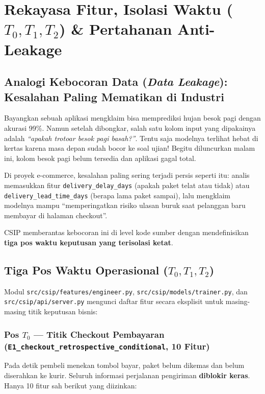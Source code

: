\documentclass[11pt,a4paper,oneside]{book}
\newcommand{\code}[1]{{\small\nolinkurl{#1}}}
\begin{document}
\chapter{Rekayasa Fitur, Isolasi Waktu ($T_0, T_1, T_2$) \& Pertahanan Anti-Leakage}

\section{Analogi Kebocoran Data (\emph{Data Leakage}): Kesalahan Paling Mematikan di Industri}

\begin{bisnisbox}
Bayangkan sebuah aplikasi mengklaim bisa memprediksi hujan besok pagi dengan akurasi 99\%. Namun setelah dibongkar, salah satu kolom input yang dipakainya adalah \emph{``apakah trotoar besok pagi basah?''}. Tentu saja modelnya terlihat hebat di kertas karena masa depan sudah bocor ke soal ujian! Begitu diluncurkan malam ini, kolom besok pagi belum tersedia dan aplikasi gagal total.
\end{bisnisbox}

Di proyek e-commerce, kesalahan paling sering terjadi persis seperti itu: analis memasukkan fitur \code{delivery_delay_days} (apakah paket telat atau tidak) atau \code{delivery_lead_time_days} (berapa lama paket sampai), lalu mengklaim modelnya mampu ``memperingatkan risiko ulasan buruk saat pelanggan baru membayar di halaman checkout''.

CSIP memberantas kebocoran ini di level kode sumber dengan mendefinisikan \textbf{tiga pos waktu keputusan yang terisolasi ketat}.

\section{Tiga Pos Waktu Operasional ($T_0, T_1, T_2$)}

Modul \code{src/csip/features/engineer.py}, \code{src/csip/models/trainer.py}, dan \code{src/csip/api/server.py} mengunci daftar fitur secara eksplisit untuk masing-masing titik keputusan bisnis:

\subsection{Pos $T_0$ --- Titik Checkout Pembayaran (\texttt{E1\_checkout\_retrospective\_conditional}, 10 Fitur)}

Pada detik pembeli menekan tombol bayar, paket belum dikemas dan belum diserahkan ke kurir. Seluruh informasi perjalanan pengiriman \textbf{diblokir keras}. Hanya 10 fitur sah berikut yang diizinkan:
\end{document}
